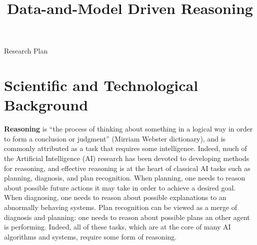 \documentclass[12pt]{article}
\newcommand{\note}[1]{\textbf{\textit{#1}}}
\begin{document}
\title{Data-and-Model Driven Reasoning}

\begin{center}
\LARGE{Research Plan}
\end{center}

\section{Scientific and Technological Background}

{\bf Reasoning} is ``the process of thinking about something in a logical way in order to form a conclusion or judgment'' (Mirriam Webster dictionary), and is commonly attributed as a task that requires some intelligence. Indeed, much of the Artificial Intelligence (AI) research has been devoted to developing methods for reasoning, and effective reasoning is at the heart of classical AI tasks such as planning, diagnosis, and plan recognition. When planning, one needs to reason about possible future actions it may take in order to achieve a desired goal. When diagnosing, one needs to reason about possible explanations to an abnormally behaving systems. Plan recognition can be viewed as a merge of diagnosis and planning: one needs to reason about possible plans an other agent is performing. Indeed, all of these tasks, which are at the core of many AI algorithms and systems, require some form of reasoning.  




\end{document}
